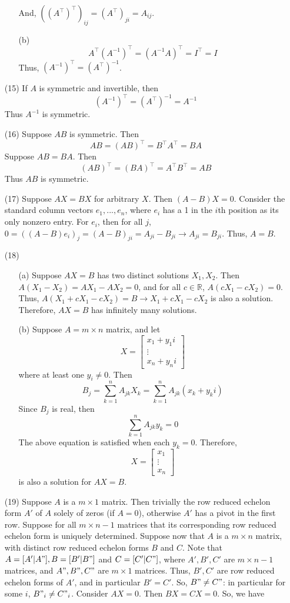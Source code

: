 \documentclass[12pt]{article}
\begin{document}
\begin{itemize}
\begin{itemize}
And, $((A^\top)^\top)_{ij} = (A^\top)_{ji} = A_{ij}$.
\item[(b)]
$$A^\top(A^{-1})^\top = (A^{-1}A)^\top = I^\top = I$$
Thus, $(A^{-1})^\top = (A^\top)^{-1}$.
\end{itemize}
\item[(15)]
If $A$ is symmetric and invertible, then
$$(A^{-1})^\top = (A^\top)^{-1} = A^{-1}$$
Thus $A^{-1}$ is symmetric.
\item[(16)]
Suppose $AB$ is symmetric. Then
$$AB = (AB)^\top = B^\top A^\top = BA$$
Suppose $AB = BA$. Then
$$(AB)^\top = (BA)^\top = A^\top B^\top = AB$$
Thus $AB$ is symmetric.
\item[(17)]
Suppose $AX = BX$ for arbitrary $X$. Then $(A - B)X = 0$. Consider the standard column vectors $e_1, ..., e_n$, where $e_i$ has a 1 in the $i$th position as its only nonzero entry. For $e_i$, then for all $j$, $0 = ((A - B)e_i)_j = (A - B)_{ji} = A_{ji} - B_{ji} \rightarrow A_{ji} = B_{ji}$. Thus, $A = B$.
\item[(18)]
\begin{itemize}
\item[(a)] Suppose $AX = B$ has two distinct solutions $X_1, X_2$. Then $A(X_1 - X_2) = AX_1 - AX_2 = 0$, and for all $c \in \mathbb{R}$, $A(cX_1 - cX_2) = 0$. Thus, $A(X_1 + cX_1 - cX_2) = B \rightarrow X_1 + cX_1 - cX_2$ is also a solution. Therefore, $AX = B$ has infinitely many solutions.
\item[(b)]
Suppose $A = m \times n$ matrix, and let
$$X = \begin{bmatrix}
x_1 + y_1i \\
\vdots \\
x_n + y_ni
\end{bmatrix}$$
where at least one $y_i \neq 0$. Then
$$B_j = \sum_{k=1}^n A_{jk}X_k = \sum_{k=1}^n A_{jk}(x_k + y_ki)$$
Since $B_j$ is real, then
$$\sum_{k=1}^n A_{jk}y_{k} = 0$$
The above equation is satisfied when each $y_{k} = 0$. Therefore,
$$X = \begin{bmatrix}
x_1 \\
\vdots \\
x_n
\end{bmatrix}$$
is also a solution for $AX = B$.
\end{itemize}
\item[(19)]
Suppose $A$ is a $m \times 1$ matrix. Then trivially the row reduced echelon form $A'$ of $A$ solely of zeros (if $A = 0$), otherwise $A'$ has a pivot in the first row. Suppose for all $m \times n - 1$ matrices that its corresponding row reduced echelon form is uniquely determined. Suppose now that $A$ is a $m \times n$ matrix, with distinct row reduced echelon forms $B$ and $C$. Note that $A = [A' | A"], B = [B' | B"]$ and $C = [C' | C"]$, where $A', B', C'$ are $m \times n - 1$ matrices, and $A", B", C"$ are $m \times 1$ matrices. Thus, $B', C'$ are row reduced echelon forms of $A'$, and in particular $B' = C'$. So, $B" \neq C"$: in particular for some $i$, $B"_i \neq C"_i$. Consider $AX = 0$. Then $BX = CX = 0$. So, we have

\end{itemize}
\end{document}

